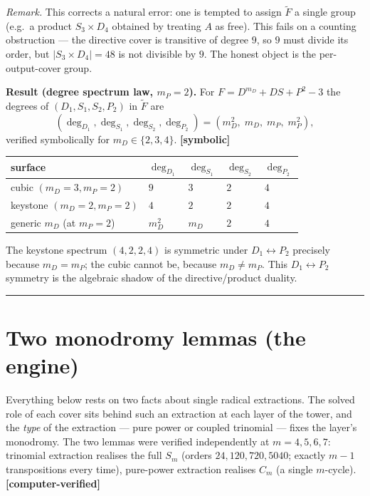 \documentclass[11pt]{article}
\theoremstyle{plain}
\theoremstyle{definition}
\theoremstyle{remark}
\begin{document}
\emph{Remark.} This corrects a natural error: one is tempted to assign \(\widetilde F\) a single group (e.g.~a product \(S_3\times D_4\) obtained by treating \(A\) as free). This fails on a counting obstruction --- the directive cover is transitive of degree \(9\), so \(9\) must divide its order, but \(|S_3\times D_4| = 48\) is not divisible by \(9\). The honest object is the per-output-cover group.

\textbf{Result (degree spectrum law, \(m_P=2\)).} For \(F = D^{m_D}+DS+P^2-3\) the degrees of \((D_1,S_1,S_2,P_2)\) in \(\widetilde F\) are \[
(\deg_{D_1}, \deg_{S_1}, \deg_{S_2}, \deg_{P_2}) = (m_D^2,\; m_D,\; m_P,\; m_P^2),
\] verified symbolically for \(m_D \in \{2,3,4\}\). \textbf{{[}symbolic{]}}

\begin{longtable}[]{@{}lllll@{}}
\toprule\noalign{}
surface & \(\deg_{D_1}\) & \(\deg_{S_1}\) & \(\deg_{S_2}\) & \(\deg_{P_2}\) \\
\midrule\noalign{}
\endhead
\bottomrule\noalign{}
\endlastfoot
cubic \((m_D{=}3,m_P{=}2)\) & \(9\) & \(3\) & \(2\) & \(4\) \\
keystone \((m_D{=}2,m_P{=}2)\) & \(4\) & \(2\) & \(2\) & \(4\) \\
generic \(m_D\) (at \(m_P{=}2\)) & \(m_D^2\) & \(m_D\) & \(2\) & \(4\) \\
\end{longtable}

The keystone spectrum \((4,2,2,4)\) is symmetric under \(D_1\leftrightarrow P_2\) precisely because \(m_D=m_P\); the cubic cannot be, because \(m_D\neq m_P\). This \(D_1\leftrightarrow P_2\) symmetry is the algebraic shadow of the directive/product duality.

\begin{center}\rule{0.5\linewidth}{0.5pt}\end{center}

\hypertarget{two-monodromy-lemmas-the-engine}{%
\section{Two monodromy lemmas (the engine)}\label{two-monodromy-lemmas-the-engine}}

Everything below rests on two facts about single radical extractions. The solved role of each cover sits behind such an extraction at each layer of the tower, and the \emph{type} of the extraction --- pure power or coupled trinomial --- fixes the layer's monodromy. The two lemmas were verified independently at \(m = 4,5,6,7\): trinomial extraction realises the full \(S_m\) (orders \(24, 120, 720, 5040\); exactly \(m-1\) transpositions every time), pure-power extraction realises \(C_m\) (a single \(m\)-cycle). \textbf{{[}computer-verified{]}}
\end{document}
